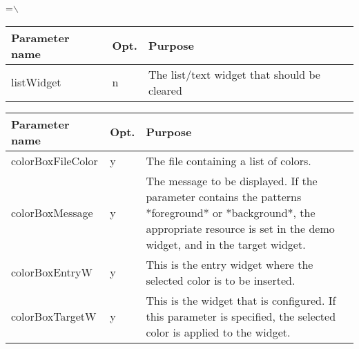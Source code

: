 {\newpage
\clearpage
\samepage \setbox\sizebox=\hbox{$\backslash$}\box\sizebox
}

{\newpage
\clearpage
\samepage \begin{figure}[ht]
  \centerline{
  \epsfysize=4.2cm
  }

  \label{fig:AlertBox}
\end{figure}
}

{\newpage
\clearpage
\samepage \begin{tabular}{|l|l|p{6.5cm}|} \hline
Parameter name & Opt. & Purpose \\  \hline
listWidget     & n    & The list/text widget that should be
                        cleared \\  \hline
\end{tabular}
}

{\newpage
\clearpage
\samepage \begin{tabular}{|l|l|p{6.7cm}|} \hline
Parameter name    & Opt. & Purpose\\  \hline
colorBoxFileColor & y    & The file containing a list of
                           colors.\\  \hline
colorBoxMessage   & y    & The message to be displayed. If
                           the parameter contains the
                           patterns *foreground* or
                           *background*, the appropriate
                           resource is set in the demo
                           widget, and in the target
                           widget.\\  \hline
colorBoxEntryW    & y    & This is the entry widget where
                           the selected color is to be
                           inserted.\\  \hline
colorBoxTargetW   & y    & This is the widget that is
                           configured. If this parameter is
                           specified, the selected color is
                           applied to the widget.\\  \hline
\end{tabular}
}

